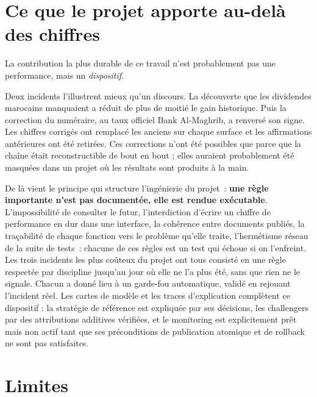 \section*{Ce que le projet apporte au-delà des chiffres}

La contribution la plus durable de ce travail n'est probablement pas une
performance, mais un \emph{dispositif}.

Deux incidents l'illustrent mieux qu'un discours. La découverte que les
dividendes marocains manquaient a réduit de plus de moitié le gain historique.
Puis la correction du numéraire, au taux officiel Bank Al-Maghrib, a renversé
son signe. Les chiffres corrigés ont remplacé les anciens sur chaque surface et
les affirmations antérieures ont été retirées. Ces corrections n'ont été
possibles que parce que la chaîne était reconstructible de bout en bout ; elles
auraient probablement été masquées dans un projet où les résultats sont produits
à la main.

De là vient le principe qui structure l'ingénierie du projet~: \textbf{une règle
importante n'est pas documentée, elle est rendue exécutable}. L'impossibilité de
consulter le futur, l'interdiction d'écrire un chiffre de performance en dur dans
une interface, la cohérence entre documents publiés, la traçabilité de chaque
fonction vers le problème qu'elle traite, l'hermétisme réseau de la suite de
tests~: chacune de ces règles est un test qui échoue si on l'enfreint. Les trois
incidents les plus coûteux du projet ont tous consisté en une règle respectée par
discipline jusqu'au jour où elle ne l'a plus été, sans que rien ne le signale.
Chacun a donné lieu à un garde-fou automatique, validé en rejouant l'incident
réel. Les cartes de modèle et les traces d'explication complètent ce dispositif :
la stratégie de référence est expliquée par ses décisions, les challengers par
des attributions additives vérifiées, et le monitoring est explicitement prêt
mais non actif tant que ses préconditions de publication atomique et de rollback
ne sont pas satisfaites.

\section*{Limites}

